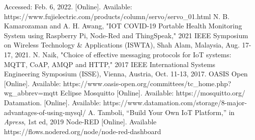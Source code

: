 \documentclass[conference]{IEEEtran}
\begin{document}
\begin{thebibliography}{00}
Accessed: Feb. 6, 2022. [Online]. Available: https://www.fujielectric.com/products/column/servo/servo\_01.html
N. B. Kamarozaman and A. H. Awang, "IOT COVID-19 Portable Health Monitoring System using Raspberry Pi, Node-Red and ThingSpeak," 2021 IEEE Symposium on Wireless Technology \& Applications (ISWTA), Shah Alam, Malaysia, Aug. 17-17, 2021.
N. Naik, "Choice of effective messaging protocols for IoT systems: MQTT, CoAP, AMQP and HTTP," 2017 IEEE International Systems Engineering Symposium (ISSE), Vienna, Austria, Oct. 11-13, 2017.
OASIS Open [Online]. Available: https://www.oasis-open.org/committees/tc\_home.php?wg\_abbrev=mqtt
Eclipse Mosquitto [Online]. Available: https://mosquitto.org/
Datamation. [Online]. Available: https://www.datamation.com/storage/8-major-advantages-of-using-mysql/
A. Tamboli, “Build Your Own IoT Platform,” in \textit{Apress}, 1st ed, 2019
Node-RED [Online]. Available https://flows.nodered.org/node/node-red-dashboard

\end{thebibliography}
\vspace{12pt}
\end{document}
